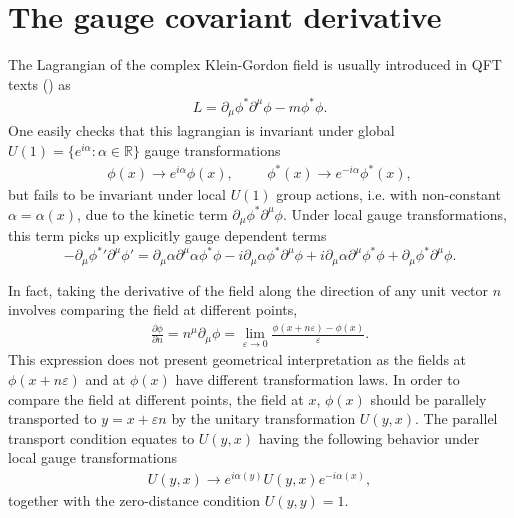 \section{The gauge covariant derivative}


The Lagrangian of the complex Klein-Gordon field is usually introduced in QFT texts (\cite{Peskin:1995ev, srednicki}) as 
\begin{align}
    L = \partial_\mu \phi^* \partial^\mu \phi - m\phi^* \phi.
\end{align}
One easily checks that this lagrangian is invariant under global $U(1) = \{ e^{i\alpha} : \alpha \in \mathbb{R}\}$ gauge transformations
\begin{align}
    \phi(x) \to e^{i\alpha} \phi(x), \hspace{1cm}
    \phi^*(x) \to e^{-i\alpha} \phi^*(x),
\end{align}
but fails to be invariant under local $U(1)$ group actions, i.e. with non-constant $\alpha = \alpha(x)$, due to the kinetic term $\partial_\mu \phi^* \partial^\mu\phi$. Under local gauge transformations, this term picks up explicitly gauge dependent terms
$$-\partial_\mu \phi^* ' \partial^\mu \phi ' = 
\partial_\mu \alpha \partial^\mu \alpha\phi^* \phi
-i \partial_\mu \alpha \phi^* \partial^\mu \phi
+i \partial_\mu \alpha \partial^\mu\phi^*  \phi
+ \partial_\mu \phi^*\partial^\mu \phi
.$$

In fact, taking the derivative of the field along the direction of any unit vector $n$ involves comparing the field at different points,
\begin{align}
   \frac{\partial \phi}{\partial n}  = n^\mu \partial_\mu \phi = \lim_{\varepsilon \to 0} \frac{\phi(x+n\varepsilon) - \phi(x)}{\varepsilon}.
\end{align}
This expression does not present geometrical interpretation as the fields at $\phi(x+n\varepsilon)$ and at $\phi(x)$ have different transformation laws.
In order to compare the field at different points, the field at $x$, $\phi(x)$ should be parallely transported  to $y=x + \varepsilon n$ by the unitary transformation $U(y, x)$. The parallel transport condition equates to $U(y, x)$ having the following behavior under local gauge transformations
\begin{align}
U(y, x) \to e^{i\alpha(y)} U(y, x) e^{-i\alpha(x)},
\end{align}
together with the zero-distance condition $U(y, y)=1$.


